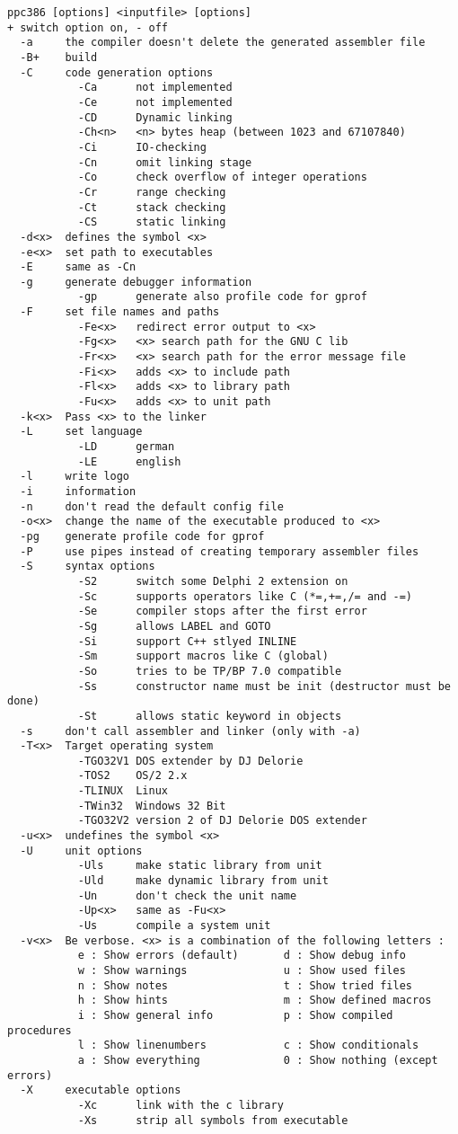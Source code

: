 \documentclass{report}
\begin{document}
\begin{verbatim}
ppc386 [options] <inputfile> [options]
+ switch option on, - off
  -a     the compiler doesn't delete the generated assembler file
  -B+    build
  -C     code generation options
           -Ca      not implemented
           -Ce      not implemented
           -CD      Dynamic linking
           -Ch<n>   <n> bytes heap (between 1023 and 67107840)
           -Ci      IO-checking
           -Cn      omit linking stage
           -Co      check overflow of integer operations
           -Cr      range checking
           -Ct      stack checking
           -CS      static linking
  -d<x>  defines the symbol <x>
  -e<x>  set path to executables
  -E     same as -Cn
  -g     generate debugger information
           -gp      generate also profile code for gprof
  -F     set file names and paths
           -Fe<x>   redirect error output to <x>
           -Fg<x>   <x> search path for the GNU C lib
           -Fr<x>   <x> search path for the error message file
           -Fi<x>   adds <x> to include path
           -Fl<x>   adds <x> to library path
           -Fu<x>   adds <x> to unit path
  -k<x>  Pass <x> to the linker
  -L     set language
           -LD      german
           -LE      english
  -l     write logo
  -i     information
  -n     don't read the default config file
  -o<x>  change the name of the executable produced to <x>
  -pg    generate profile code for gprof
  -P     use pipes instead of creating temporary assembler files
  -S     syntax options
           -S2      switch some Delphi 2 extension on
           -Sc      supports operators like C (*=,+=,/= and -=)
           -Se      compiler stops after the first error
           -Sg      allows LABEL and GOTO
           -Si      support C++ stlyed INLINE
           -Sm      support macros like C (global)
           -So      tries to be TP/BP 7.0 compatible
           -Ss      constructor name must be init (destructor must be done)
           -St      allows static keyword in objects
  -s     don't call assembler and linker (only with -a)
  -T<x>  Target operating system
           -TGO32V1 DOS extender by DJ Delorie
           -TOS2    OS/2 2.x
           -TLINUX  Linux
           -TWin32  Windows 32 Bit
           -TGO32V2 version 2 of DJ Delorie DOS extender
  -u<x>  undefines the symbol <x>
  -U     unit options
           -Uls     make static library from unit
           -Uld     make dynamic library from unit
           -Un      don't check the unit name
           -Up<x>   same as -Fu<x>
           -Us      compile a system unit
  -v<x>  Be verbose. <x> is a combination of the following letters :
           e : Show errors (default)       d : Show debug info
           w : Show warnings               u : Show used files
           n : Show notes                  t : Show tried files
           h : Show hints                  m : Show defined macros
           i : Show general info           p : Show compiled procedures
           l : Show linenumbers            c : Show conditionals
           a : Show everything             0 : Show nothing (except errors)
  -X     executable options
           -Xc      link with the c library
           -Xs      strip all symbols from executable


\end{verbatim}
\end{document}
